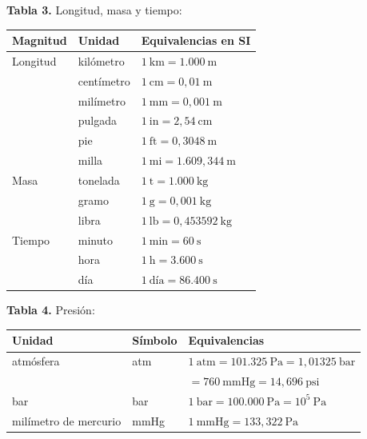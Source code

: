 \documentclass[12pt, letterpaper]{article}
\begin{document}
\begin{cuadroteoria}
  \textbf{Tabla 3.} Longitud, masa y tiempo:
  \begin{center}
    \begin{tabular}{lll}
      \toprule
      \textbf{Magnitud} & \textbf{Unidad} & \textbf{Equivalencias en SI} \\
      \midrule
      Longitud & kilómetro & $1\ \text{km} = 1.000\ \text{m}$          \\
               & centímetro & $1\ \text{cm} = 0{,}01\ \text{m}$        \\
               & milímetro  & $1\ \text{mm} = 0{,}001\ \text{m}$       \\
               & pulgada    & $1\ \text{in} = 2{,}54\ \text{cm}$       \\
               & pie        & $1\ \text{ft} = 0{,}3048\ \text{m}$      \\
               & milla      & $1\ \text{mi} = 1.609{,}344\ \text{m}$   \\
      \midrule
      Masa     & tonelada   & $1\ \text{t} = 1.000\ \text{kg}$          \\
               & gramo      & $1\ \text{g} = 0{,}001\ \text{kg}$       \\
               & libra      & $1\ \text{lb} = 0{,}453592\ \text{kg}$   \\
      \midrule
      Tiempo   & minuto     & $1\ \text{min} = 60\ \text{s}$            \\
               & hora       & $1\ \text{h} = 3.600\ \text{s}$           \\
               & día        & $1\ \text{día} = 86.400\ \text{s}$        \\
      \bottomrule
    \end{tabular}
  \end{center}
\end{cuadroteoria}

\begin{cuadroteoria}
  \textbf{Tabla 4.} Presión:
  \begin{center}
    \begin{tabular}{lll}
      \toprule
      \textbf{Unidad} & \textbf{Símbolo} & \textbf{Equivalencias} \\
      \midrule
      atmósfera  & atm & $1\ \text{atm} = 101.325\ \text{Pa} = 1{,}01325\ \text{bar}$        \\
                  &     & $= 760\ \text{mmHg} = 14{,}696\ \text{psi}$                        \\
      bar        & bar & $1\ \text{bar} = 100.000\ \text{Pa} = 10^{5}\ \text{Pa}$            \\
      milímetro de mercurio & mmHg & $1\ \text{mmHg} = 133{,}322\ \text{Pa}$ \\
      \bottomrule
    \end{tabular}
  \end{center}
\end{cuadroteoria}
\end{document}
